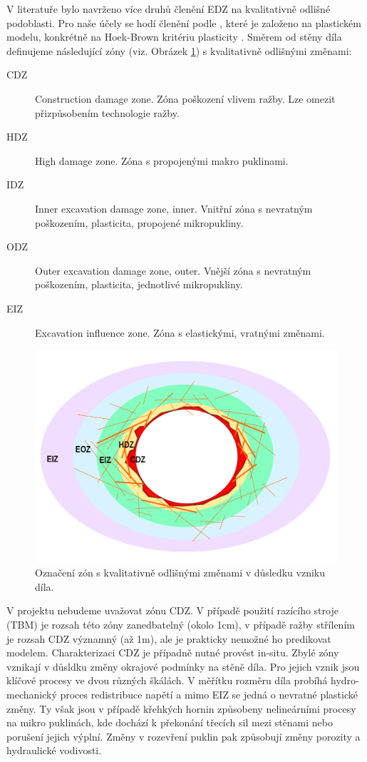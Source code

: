 \documentclass{article}
\begin{document}
V literatuře bylo navrženo více druhů členění EDZ na kvalitativně odlišné podoblasti. Pro naše účely se hodí členění podle \cite{Perras2016}, 
které je založeno na plastickém modelu, konkrétně na Hoek-Brown kritériu plasticity \cite{Hoek2002}. Směrem od stěny díla definujeme následující zóny (viz. Obrázek \ref{fig:edz_zones}) s kvalitativně odlišnými změnami:
\begin{description}
\item[CDZ] Construction damage zone. Zóna poškození vlivem ražby. Lze omezit přizpůsobením technologie ražby.
\item[HDZ] High damage zone. Zóna s propojenými makro puklinami. 
\item[IDZ] Inner excavation damage zone, inner. Vnitřní zóna s nevratným poškozením, plasticita, propojené mikropukliny.
\item[ODZ] Outer excavation damage zone, outer. Vnější zóna s nevratným poškozením, plasticita, jednotlivé mikropukliny.
\item[EIZ] Excavation influence zone. Zóna s elastickými, vratnými změnami.
\end{description}


\begin{figure}
    \centering
    \includegraphics[width=\textwidth]{graphics/EDZ_structure.pdf}
    \caption{Označení zón s kvalitativně odlišnými změnami v důsledku vzniku díla.}
    \label{fig:edz_zones}
\end{figure}

V projektu nebudeme uvažovat zónu CDZ. V případě použití razícího stroje (TBM) je rozsah této zóny zanedbatelný (okolo 1cm), v případě 
ražby střílením je rozsah CDZ významný (až 1m), ale je prakticky nemožné ho predikovat modelem. Charakterizaci CDZ je případně nutné provést in-situ.
Zbylé zóny vznikají v důsldku změny okrajové podmínky na stěně díla. Pro jejich vznik jsou klíčové procesy ve dvou různých škálách. V měřítku rozměru 
díla probíhá hydro-mechanický proces redistribuce napětí a mimo EIZ se jedná o nevratné plastické změny. Ty však jsou v případě křehkých hornin
způsobeny nelineárními procesy na mikro puklinách, kde dochází k překonání třecích sil mezi stěnami nebo porušení jejich výplní. 
Změny v rozevření puklin pak způsobují změny porozity a hydraulické vodivosti. 
\end{document}
